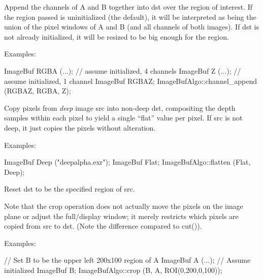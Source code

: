  
Append the channels of {\cf A} and {\cf B} together into {\cf dst} over
the region of interest.  If the region passed is uninitialized (the
default), it will be interpreted as being the union of the pixel windows
of {\cf A} and {\cf B} (and all channels of both images).  If {\cf dst}
is not already initialized, it will be resized to be big enough for the
region.

\smallskip
\noindent Examples:
\begin{code}
    ImageBuf RGBA (...);   // assume initialized, 4 channels
    ImageBuf Z (...);      // assume initialized, 1 channel
    ImageBuf RGBAZ;
    ImageBufAlgo::channel_append (RGBAZ, RGBA, Z);
\end{code}
\apiend


  
Copy pixels from \emph{deep} image {\cf src} into non-deep {\cf dst},
compositing the depth samples within each pixel to yield a single ``flat''
value per pixel. If {\cf src} is not deep, it just copies the pixels without
alteration.

\smallskip
\noindent Examples:
\begin{code}
    ImageBuf Deep ("deepalpha.exr");
    ImageBuf Flat;
    ImageBufAlgo::flatten (Flat, Deep);
\end{code}
\apiend


 
Reset {\cf dst} to be the specified region of {\cf src}.

Note that the {\cf crop} operation does not actually move the pixels on the
image plane or adjust the full/display window; it merely restricts which
pixels are copied from {\cf src} to {\cf dst}.  (Note the difference
compared to {\cf cut()}).

\smallskip
\noindent Examples:
\begin{code}
    // Set B to be the upper left 200x100 region of A
    ImageBuf A (...);  // Assume initialized
    ImageBuf B;
    ImageBufAlgo::crop (B, A, ROI(0,200,0,100));
\end{code}
\apiend


